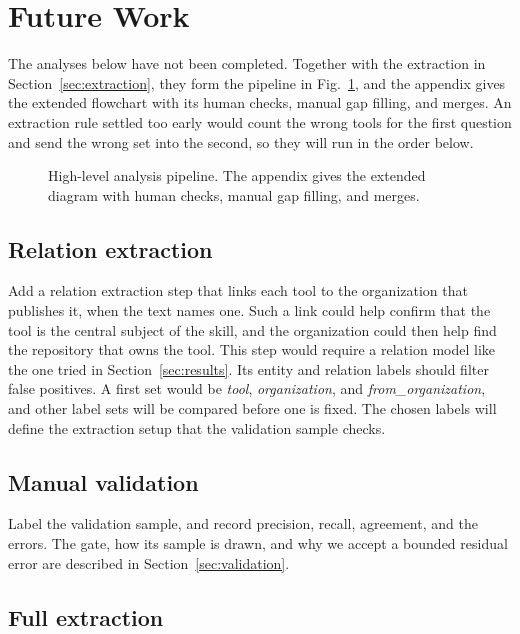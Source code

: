 \section{Future Work}
\label{sec:future}

The analyses below have not been completed.
Together with the extraction in Section~\ref{sec:extraction}, they form the pipeline in Fig.~\ref{fig:pipeline-simple}, and the appendix gives the extended flowchart with its human checks, manual gap filling, and merges.
An extraction rule settled too early would count the wrong tools for the first question and send the wrong set into the second, so they will run in the order below.

\begin{figure}[!t]
  \centering
  
  \caption{High-level analysis pipeline.
    The appendix gives the extended diagram with human checks, manual gap filling, and merges.}
  \label{fig:pipeline-simple}
\end{figure}

\subsection{Relation extraction}
\label{sec:relation}

Add a relation extraction step that links each tool to the organization that publishes it, when the text names one.
Such a link could help confirm that the tool is the central subject of the skill, and the organization could then help find the repository that owns the tool.
This step would require a relation model like the one tried in Section~\ref{sec:results}.
Its entity and relation labels should filter false positives.
A first set would be \textit{tool}, \textit{organization}, and \textit{from\_organization}, and other label sets will be compared before one is fixed.
The chosen labels will define the extraction setup that the validation sample checks.

\subsection{Manual validation}

Label the validation sample, and record precision, recall, agreement, and the errors.
The gate, how its sample is drawn, and why we accept a bounded residual error are described in Section~\ref{sec:validation}.

\subsection{Full extraction}

